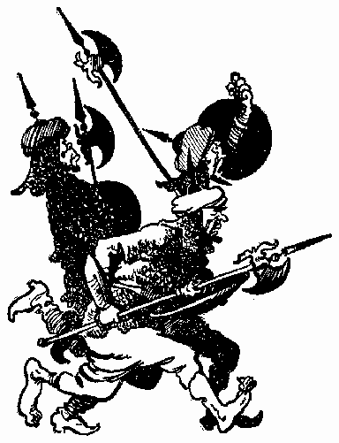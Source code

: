 \documentclass[12pt,a4paper]{book}
\begin{document}
\begin{figure}[t]
\centering
\includegraphics[scale=0.7]{19.png}
\end{figure}
\end{document}
